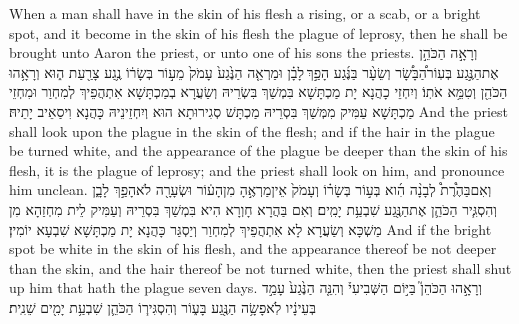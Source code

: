 {When a man shall have in the skin of his flesh a rising, or a scab, or a bright spot, and it become in the skin of his flesh the plague of leprosy, then he shall be brought unto Aaron the priest, or unto one of his sons the priests.}{}
{וְרָאָ֣ה הַכֹּהֵ֣ן אֶת\maqqaf הַנֶּ֣גַע בְּעֽוֹר\maqqaf הַ֠בָּשָׂ֠ר וְשֵׂעָ֨ר בַּנֶּ֜גַע הָפַ֣ךְ \legarmeh  לָבָ֗ן וּמַרְאֵ֤ה הַנֶּ֙גַע֙ עָמֹק֙ מֵע֣וֹר בְּשָׂר֔וֹ נֶ֥גַע צָרַ֖עַת ה֑וּא וְרָאָ֥הוּ הַכֹּהֵ֖ן וְטִמֵּ֥א אֹתֽוֹ׃}
{וְיִחְזֵי כָהֲנָא יָת מַכְתָּשָׁא בִּמְשַׁךְ בִּשְׂרֵיהּ וְשַׂעֲרָא בְמַכְתָּשָׁא אִתְהֲפֵיךְ לְמִחְוַר וּמִחְזֵי מַכְתָּשָׁא עַמִּיק מִמְּשַׁךְ בִּסְרֵיהּ מַכְתָּשׁ סְגִירוּתָא הוּא וְיִחְזֵינֵיהּ כָּהֲנָא וִיסַאֵיב יָתֵיהּ׃}
{And the priest shall look upon the plague in the skin of the flesh; and if the hair in the plague be turned white, and the appearance of the plague be deeper than the skin of his flesh, it is the plague of leprosy; and the priest shall look on him, and pronounce him unclean.}{}
{וְאִם\maqqaf בַּהֶ֩רֶת֩ לְבָנָ֨ה הִ֜וא בְּע֣וֹר בְּשָׂר֗וֹ וְעָמֹק֙ אֵין\maqqaf מַרְאֶ֣הָ מִן\maqqaf הָע֔וֹר וּשְׂעָרָ֖ה לֹא\maqqaf הָפַ֣ךְ לָבָ֑ן וְהִסְגִּ֧יר הַכֹּהֵ֛ן אֶת\maqqaf הַנֶּ֖גַע שִׁבְעַ֥ת יָמִֽים׃}
{וְאִם בַּהֲרָא חָוְרָא הִיא בִּמְשַׁךְ בִּסְרֵיהּ וְעַמִּיק לֵית מִחְזַהָא מִן מַשְׁכָּא וְשַׂעֲרָא לָא אִתְהֲפֵיךְ לְמִחְוַר וְיַסְגַּר כָּהֲנָא יָת מַכְתָּשָׁא שִׁבְעָא יוֹמִין׃}
{And if the bright spot be white in the skin of his flesh, and the appearance thereof be not deeper than the skin, and the hair thereof be not turned white, then the priest shall shut up him that hath the plague seven days.}{}
{וְרָאָ֣הוּ הַכֹּהֵן֮ בַּיּ֣וֹם הַשְּׁבִיעִי֒ וְהִנֵּ֤ה הַנֶּ֙גַע֙ עָמַ֣ד בְּעֵינָ֔יו לֹֽא\maqqaf פָשָׂ֥ה הַנֶּ֖גַע בָּע֑וֹר וְהִסְגִּיר֧וֹ הַכֹּהֵ֛ן שִׁבְעַ֥ת יָמִ֖ים שֵׁנִֽית׃}
